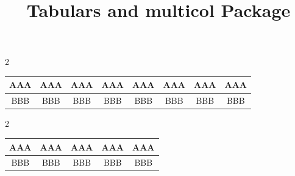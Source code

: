 \documentclass{article}
\title{\Huge Tabulars and multicol Package}
\date{}
\begin{document}
	\maketitle
	
	\begin{multicols}{2}
		\kant[1-5]
	\end{multicols}
	
	\begin{table}[h]
		\centering
		\begin{tabular}{|*{8}{c|}}
			\hline
			AAA&AAA&AAA&AAA&AAA&AAA&AAA&AAA \\
			\hline\hline
			BBB&BBB&BBB&BBB&BBB&BBB&BBB&BBB \\
			\hline
		\end{tabular}
	\end{table}
	
	\begin{multicols}{2}
		\kant[1-2]
		\vspace{10pt}
		\begin{center}
		\begin{tabular}{|*{5}{c|}}
			\hline
			AAA&AAA&AAA&AAA&AAA \\
			\hline\hline
			BBB&BBB&BBB&BBB&BBB \\
			\hline
		\end{tabular}
		\end{center}
		\vspace{10pt}
		
		\kant[1-2]
	\end{multicols}
	
\end{document}
